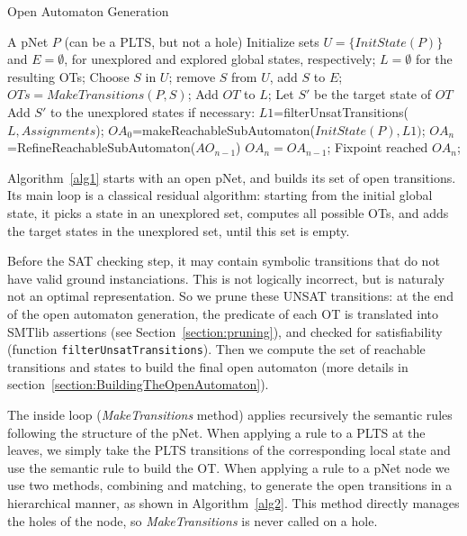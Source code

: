 \documentclass[smallcondensed]{svjour3}
\begin{document}
\begin{algorithm}[h]
  \caption{Open Automaton Generation}
  \label{alg1}
\begin{algorithmic}[1]
\Require A pNet $P$ (can be a PLTS, but not a hole)
\State Initialize sets $U=\{\mathit{InitState}(P)\}$ and $E=\emptyset$,
for unexplored and explored global states, respectively; $L=\emptyset$ for the resulting OTs;
	\State Choose $S$ in $U$; remove $S$ from $U$, add $S$ to $E$;
	\State $\mathit{OTs} = \mathit{MakeTransitions}(P, S)$;
          \State Add $\mathit{OT}$ to $L$;
          \State Let $S'$ be the target state of $\mathit{OT}$
          Add $S'$ to the unexplored states if necessary:
	  \EndFor
\EndWhile
\State $\mathit{L1}$=filterUnsatTransitions($\mathit{L,Assignments}$);
\State $\mathit{OA_0}$=makeReachableSubAutomaton($\mathit{InitState}(P),L1)$;
\Repeat $\mathit{OA_n}$=RefineReachableSubAutomaton($\mathit{AO_{n-1}}$)
\Until  $\mathit{OA_n}=\mathit{OA_{n-1}}$; \Comment Fixpoint reached
\State \Return $\mathit{OA_n}$;

\end{algorithmic}  
\end{algorithm}

Algorithm~\ref{alg1} starts with an open pNet, and builds its set of open
transitions. Its main loop is a classical residual algorithm: starting
from the initial global state, it picks a state in an unexplored set, 
computes all possible OTs, and adds the target states in the
unexplored set, until this set is empty.

Before the SAT checking step, it may contain symbolic transitions that
do not have valid ground instanciations. This is not logically
incorrect, but is naturaly not an optimal representation. So we prune
these UNSAT transitions: at the end of the open automaton generation,
the predicate of each OT is translated 
into SMTlib assertions (see Section~\ref{section:pruning}), and checked for
satisfiability (function \texttt{filterUnsatTransitions}). 
Then we compute the set of reachable transitions and states to build
the final open automaton (more details in section~\ref{section:BuildingTheOpenAutomaton}).

The inside loop (\emph{MakeTransitions} method) applies recursively
the semantic rules following the structure of the pNet.
When applying a rule to a PLTS at the leaves, we simply take the PLTS transitions of the
corresponding local state and use the semantic rule to build the OT.
When applying a rule to a pNet node we use two methods, combining and
matching, to generate the open transitions in a hierarchical manner,
as shown in Algorithm~\ref{alg2}. This method directly manages the
holes of the node, so \emph{MakeTransitions} is never called on a hole.
\end{document}
